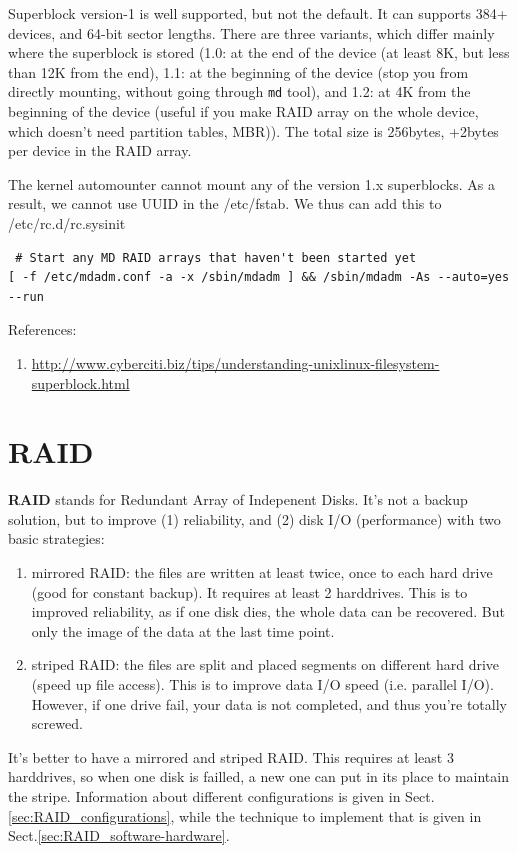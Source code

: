 Superblock version-1 is well supported, but not the default. It can supports
384+ devices, and 64-bit sector lengths. There are three variants, which differ
mainly where the superblock is stored (1.0: at the end of the device (at least
8K, but less than 12K from the end), 1.1: at the beginning of the device (stop
you from directly mounting, without going through \verb!md! tool), and 1.2: at
4K from the beginning of the device (useful if you make RAID array on the whole
device, which doesn't need partition tables, MBR)). The total size is 256bytes,
+2bytes per device in the RAID array.

The kernel automounter cannot mount any of the version 1.x superblocks. As a
result, we cannot use UUID in the /etc/fstab. We thus can add this to
/etc/rc.d/rc.sysinit
\begin{verbatim}
 # Start any MD RAID arrays that haven't been started yet
[ -f /etc/mdadm.conf -a -x /sbin/mdadm ] && /sbin/mdadm -As --auto=yes --run
\end{verbatim}

References:
\begin{enumerate}
  \item
  \url{http://www.cyberciti.biz/tips/understanding-unixlinux-filesystem-superblock.html}
\end{enumerate}
  
\section{RAID}
\label{sec:RAID}

{\bf RAID} stands for Redundant Array of Indepenent Disks. It's not a backup
solution, but to improve (1) reliability, and (2) disk I/O (performance) with
two basic strategies:
\begin{enumerate}
  \item mirrored RAID: the files are written at least twice, once to each hard
  drive (good for constant backup). It requires at least 2 harddrives. This is
  to improved reliability, as if one disk dies, the whole data can be recovered.
  But only the image of the data at the last time point.
  
  
  
  \item striped RAID: the files are split and placed segments on different hard
  drive (speed up file access). This is to improve data I/O speed (i.e.
  parallel I/O). However, if one drive fail, your data is not completed, and
  thus you're totally screwed.
\end{enumerate}
It's better to have a mirrored and striped RAID. This requires at least 3
harddrives, so when one disk is failled,  a new one can put in its place to
maintain the stripe. Information about different configurations is given in
Sect.\ref{sec:RAID_configurations}, while the technique to implement that is
given in Sect.\ref{sec:RAID_software-hardware}.


